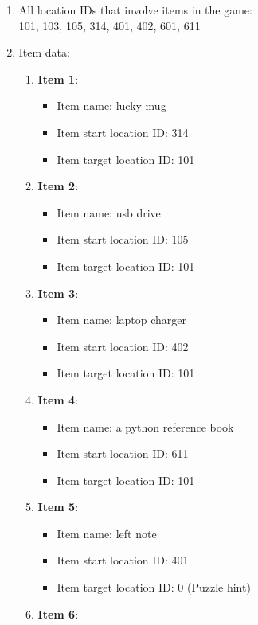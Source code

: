 \documentclass[11pt]{article}
\begin{document}
\begin{enumerate}
\item All location IDs that involve items in the game:\\101, 103, 105, 314, 401, 402, 601, 611\\

\item Item data:
\begin{enumerate}
    \item \textbf{Item 1}:
\begin{itemize}
    \item Item name: lucky mug
    \item Item start location ID: 314
    \item Item target location ID: 101
\end{itemize}
    \item \textbf{Item 2}:
\begin{itemize}
    \item Item name: usb drive
    \item Item start location ID: 105
    \item Item target location ID: 101
\end{itemize}
    \item \textbf{Item 3}:
\begin{itemize}
    \item Item name: laptop charger
    \item Item start location ID: 402
    \item Item target location ID: 101
\end{itemize}
    \item \textbf{Item 4}:
\begin{itemize}
    \item Item name: a python reference book 
    \item Item start location ID: 611 
    \item Item target location ID: 101 
\end{itemize}
    \item \textbf{Item 5}:
\begin{itemize}
    \item Item name: left note 
    \item Item start location ID: 401 
    \item Item target location ID: 0 (Puzzle hint) 
\end{itemize}
    \item \textbf{Item 6}:
\begin{itemize}

\end{itemize}
\end{enumerate}
\end{enumerate}
\end{document}
